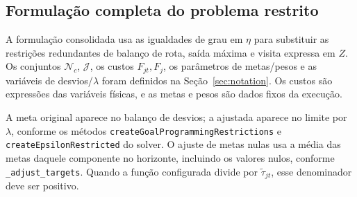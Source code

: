 \documentclass[11pt,a4paper]{article}
\newcommand{\N}{\mathcal{N}}
\begin{document}
\subsection{Formulação completa do problema restrito}
\label{sec:restricted-complete}

A formulação consolidada usa as igualdades de grau em $\eta$ para substituir as restrições redundantes de balanço de rota, saída máxima e visita expressa em $Z$. Os conjuntos $\N_c$, $\mathcal J$, os custos $F_{jt},F_j$, os parâmetros de metas/pesos e as variáveis de desvios/$\lambda$ foram definidos na Seção~\ref{sec:notation}. Os custos são expressões das variáveis físicas, e as metas e pesos são dados fixos da execução.

A meta original aparece no balanço de desvios; a ajustada aparece no limite por $\lambda$, conforme os métodos \texttt{createGoalProgrammingRestrictions} e \texttt{createEpsilonRestricted} do solver. O ajuste de metas nulas usa a média das metas daquele componente no horizonte, incluindo os valores nulos, conforme \texttt{\_adjust\_targets}. Quando a função configurada divide por $\widetilde\tau_{jt}$, esse denominador deve ser positivo.
\end{document}
